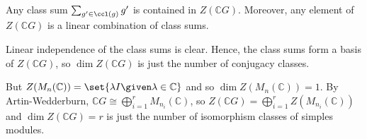 Any class sum $\sum_{g' \in \ccl(g)}g'$ is contained in $Z(\mathbb{C}G)$.
Moreover, any element of $Z(\mathbb{C}G)$ is a linear combination of class sums.

Linear independence of the class sums is clear. Hence, the class sums form a
basis of $Z(\mathbb{C}G)$, so $\dim Z(\mathbb{C}G)$ is just the number of
conjugacy classes.

But $Z(M_n(\mathbb{C})) = \set{\lambda I\given \lambda \in \mathbb{C}}$ and so
$\dim Z(M_n(\mathbb{C})) = 1$. By Artin-Wedderburn, $\mathbb{C}G\cong \bigoplus_{i = 1}^r M_{n_i}(\mathbb{C})$,
so $Z(\mathbb{C}G) = \bigoplus_{i =1}^rZ(M_{n_i}(\mathbb{C}))$ and
$\dim Z(\mathbb{C}G) = r$ is just the number of isomorphism classes of simples modules.
